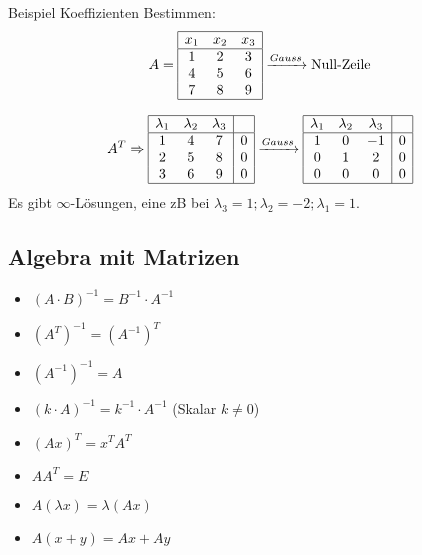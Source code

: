 \noindent Beispiel Koeffizienten Bestimmen:
\[
A = \begin{array}{|ccc|}
	\hline
	x_1 & x_2 & x_3 \\
	\hline
	1 & 2 & 3 \\
	4 & 5 & 6 \\
	7 & 8 & 9 \\
	\hline
\end{array} \xrightarrow{Gauss} \text{Null-Zeile}
\]

\[
A^T \Rightarrow
	\begin{array}{|ccc|c|}
		\hline
		\lambda_1 & \lambda_2 & \lambda_3 & \\
		\hline
		1 & 4 & 7 & 0 \\
		2 & 5 & 8 & 0 \\
		3 & 6 & 9 & 0 \\
		\hline
	\end{array}
	\xrightarrow{Gauss}
	\begin{array}{|ccc|c|}
		\hline
		\lambda_1 & \lambda_2 & \lambda_3 & \\
		\hline
		1 & 0 & -1 & 0 \\
		0 & 1 & 2 & 0 \\
		0 & 0 & 0 & 0 \\
		\hline
	\end{array}
\]
Es gibt $\infty$-Lösungen, eine zB bei $\lambda_3 = 1; \lambda_2 = -2; \lambda_1 = 1$.

\subsection{Algebra mit Matrizen}
\begin{itemize}[nosep]
	\item $(A \cdot B)^{-1} = B^{-1} \cdot A^{-1}$
	\item $(A^T)^{-1} = (A^{-1})^T$
	\item $(A^{-1})^{-1} = A$
	\item $(k \cdot A)^{-1} = k^{-1} \cdot A^{-1}$ (Skalar $k \neq 0$)
	\item $(Ax)^T = x^TA^T$
	\item $AA^T = E$
	\item $A(\lambda x) = \lambda(Ax)$
	\item $A(x + y) = Ax + Ay$
\end{itemize}


